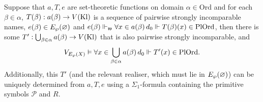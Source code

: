 \documentclass[12pt,openany]{book}
\theoremstyle{plain}
\theoremstyle{definition}
\newcommand\uppar[1]{{\upshape(}#1{\upshape)}}
\newcommand\opA[1]{\mathop{\forall #1}}
\newcommand\Pow{\mathcal{P}}
\newcommand\Ord{\mathrm{Ord}}
\newcommand\PlOrd{\mathrm{PlOrd}}
\newcommand\Kl{\mathrm{Kl}}
\begin{document}
\begin{lemma}
  \label{lem:kpp-incom-seq-ord-union}
  Suppose that $a, T, e$ are set-theoretic functions on domain $\alpha \in \Ord$ and for each $\beta \in \alpha$, $T\mleft(\beta\mright) : a\mleft(\beta\mright) \rightarrow V\mleft(\Kl\mright)$ is a sequence of pairwise strongly incomparable names, $e\mleft(\beta\mright) \in E_\wp\mleft(\varnothing\mright)$ and $e\mleft(\beta\mright) \Vdash_\mathfrak{w} \opA{x \in a\mleft(\beta\mright)} d_0 \Vdash T\mleft(\beta\mright)\mleft(x\mright) \in \PlOrd$, then there is some $T' : \bigcup_{\beta \in \alpha} a\mleft(\beta\mright) \rightarrow V\mleft(\Kl\mright)$ that is also pairwise strongly incomparable, and
  \[V_{E_\wp\mleft(X\mright)} \vDash \opA{x \in \bigcup_{\beta \in \alpha} a\mleft(\beta\mright)} d_0 \Vdash T'\mleft(x\mright) \in \PlOrd.\]
  Additionally, this $T'$ \uppar{and the relevant realiser, which must lie in $E_\wp\mleft(\varnothing\mright)$} can be uniquely determined from $a, T, e$ using a $\Sigma_1$-formula containing the primitive symbols $\Pow$ and $R$.
\end{lemma}
\end{document}

